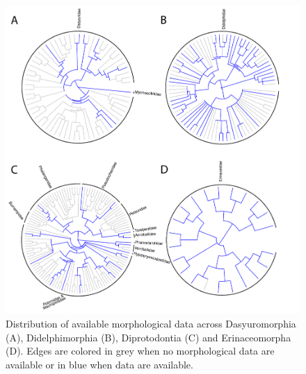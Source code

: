 \begin{figure}[!ht]
\centering
    \includegraphics[width=\textwidth]{Supplementaries/Figures/MissingMammals/Combined_phy2.pdf}
\caption[Available data in Dasyuromorphia, Didelphimorphia, Diprotodontia and Erinaceomorpha]{Distribution of available morphological data across Dasyuromorphia (A), Didelphimorphia (B), Diprotodontia (C) and Erinaceomorpha (D). Edges are colored in grey when no morphological data are available or in blue when data are available.}
\label{Supp_combined_phy2}
\end{figure}

